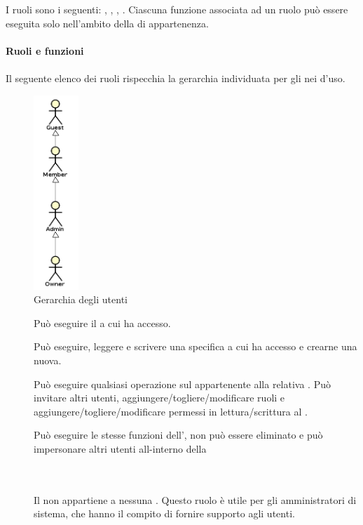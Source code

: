 \begin{description}
	I ruoli sono i seguenti: , , , .	
	Ciascuna funzione associata ad un ruolo pu\`o essere eseguita solo nell'ambito della  di appartenenza. \\\\
	\textbf{Ruoli e funzioni} \hfill \\\\
		Il seguente elenco dei ruoli rispecchia la gerarchia individuata per gli  nei  d'uso.
                 \begin{figure}[H]
                   \begin{center}
                     \includegraphics[width=0.15\textwidth]{res/img/UCUtenti/gerarchia_utenti.png}
                     \caption{Gerarchia degli utenti}
                   \end{center} 
                 \end{figure}  
		\begin{description}
			\item[] Pu\`o eseguire il  a cui ha accesso.
			\item[] Pu\`o eseguire, leggere e scrivere una specifica  a cui ha accesso e crearne una nuova.
			\item[] Pu\`o eseguire qualsiasi operazione sul  appartenente alla relativa . Pu\`o invitare altri utenti, aggiungere/togliere/modificare ruoli e aggiungere/togliere/modificare permessi in lettura/scrittura al .
			\item[] Pu\`o eseguire le stesse funzioni dell', non pu\`o essere eliminato e pu\`o impersonare altri utenti all-interno della 
                        \item[] \hfill \\\\
	Il  non appartiene a nessuna . Questo ruolo \`e utile per gli amministratori di sistema, che hanno il compito di fornire supporto agli utenti.
		\end{description}
\end{description}

\newpage
